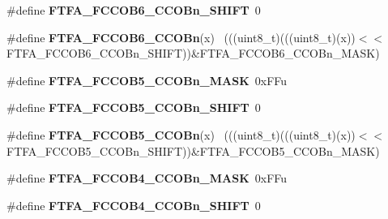 \begin{DoxyCompactItemize}
\item 
\hypertarget{group___f_t_f_a___register___masks_gaf859b028e8f5d2dfdbaed9aeccc6c66c}{}\#define {\bfseries F\+T\+F\+A\+\_\+\+F\+C\+C\+O\+B6\+\_\+\+C\+C\+O\+Bn\+\_\+\+S\+H\+I\+F\+T}~0\label{group___f_t_f_a___register___masks_gaf859b028e8f5d2dfdbaed9aeccc6c66c}

\item 
\hypertarget{group___f_t_f_a___register___masks_ga18849d340dcdc20ea40db2b7983c1ec3}{}\#define {\bfseries F\+T\+F\+A\+\_\+\+F\+C\+C\+O\+B6\+\_\+\+C\+C\+O\+Bn}(x)                                      ~(((uint8\+\_\+t)(((uint8\+\_\+t)(x))$<$$<$F\+T\+F\+A\+\_\+\+F\+C\+C\+O\+B6\+\_\+\+C\+C\+O\+Bn\+\_\+\+S\+H\+I\+F\+T))\&F\+T\+F\+A\+\_\+\+F\+C\+C\+O\+B6\+\_\+\+C\+C\+O\+Bn\+\_\+\+M\+A\+S\+K)\label{group___f_t_f_a___register___masks_ga18849d340dcdc20ea40db2b7983c1ec3}

\item 
\hypertarget{group___f_t_f_a___register___masks_ga6112d953d0c0527ada279726c9b0c5a3}{}\#define {\bfseries F\+T\+F\+A\+\_\+\+F\+C\+C\+O\+B5\+\_\+\+C\+C\+O\+Bn\+\_\+\+M\+A\+S\+K}~0x\+F\+Fu\label{group___f_t_f_a___register___masks_ga6112d953d0c0527ada279726c9b0c5a3}

\item 
\hypertarget{group___f_t_f_a___register___masks_ga632fbfd380fcb5f46e4388b4edb490b2}{}\#define {\bfseries F\+T\+F\+A\+\_\+\+F\+C\+C\+O\+B5\+\_\+\+C\+C\+O\+Bn\+\_\+\+S\+H\+I\+F\+T}~0\label{group___f_t_f_a___register___masks_ga632fbfd380fcb5f46e4388b4edb490b2}

\item 
\hypertarget{group___f_t_f_a___register___masks_ga14b3943ceda09b2fc2066e2728c4af08}{}\#define {\bfseries F\+T\+F\+A\+\_\+\+F\+C\+C\+O\+B5\+\_\+\+C\+C\+O\+Bn}(x)                                      ~(((uint8\+\_\+t)(((uint8\+\_\+t)(x))$<$$<$F\+T\+F\+A\+\_\+\+F\+C\+C\+O\+B5\+\_\+\+C\+C\+O\+Bn\+\_\+\+S\+H\+I\+F\+T))\&F\+T\+F\+A\+\_\+\+F\+C\+C\+O\+B5\+\_\+\+C\+C\+O\+Bn\+\_\+\+M\+A\+S\+K)\label{group___f_t_f_a___register___masks_ga14b3943ceda09b2fc2066e2728c4af08}

\item 
\hypertarget{group___f_t_f_a___register___masks_ga42b1625323567bb015cf90601b468433}{}\#define {\bfseries F\+T\+F\+A\+\_\+\+F\+C\+C\+O\+B4\+\_\+\+C\+C\+O\+Bn\+\_\+\+M\+A\+S\+K}~0x\+F\+Fu\label{group___f_t_f_a___register___masks_ga42b1625323567bb015cf90601b468433}

\item 
\hypertarget{group___f_t_f_a___register___masks_ga22245895591851bc7a547b2fe5464b63}{}\#define {\bfseries F\+T\+F\+A\+\_\+\+F\+C\+C\+O\+B4\+\_\+\+C\+C\+O\+Bn\+\_\+\+S\+H\+I\+F\+T}~0\label{group___f_t_f_a___register___masks_ga22245895591851bc7a547b2fe5464b63}


\end{DoxyCompactItemize}

